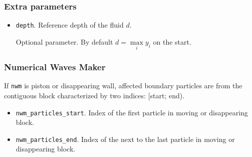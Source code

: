 \subsubsection{Extra parameters}

\begin{itemize}
    \item \verb|depth|. Reference depth of the fluid $d$.
    
    Optional parameter. By default $d = \max\limits_{i}y_{i}$ on the start.
\end{itemize}

\subsubsection{Numerical Waves Maker}
If \verb|nwm| is piston or disappearing wall, affected boundary particles are from the contiguous block characterized by two indices: [start; end).

\begin{itemize}
    \item \verb|nwm_particles_start|. Index of the first particle in moving or disappearing block.
    \item \verb|nwm_particles_end|. Index of the next to the last particle in moving or disappearing block.
\end{itemize}
